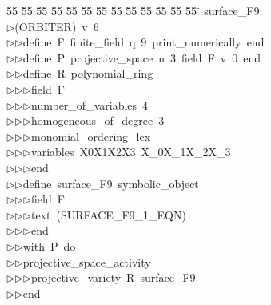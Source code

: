 %
%
\begin{tabbing}
55 \= 55 \= 55 \= 55 \= 55 \= 55 \= 55 \= 55 \= 55 \= 55 \= 55 \= 55 \= 55 \= \kill
surface\_F9:\\[0pt]
$\triangleright$\>(ORBITER)\ v\ 6\ \\[0pt]
$\triangleright$\>$\triangleright$\>define\ F\ finite\_field\ q\ 9\ print\_numerically\ end\ \\[0pt]
$\triangleright$\>$\triangleright$\>define\ P\ projective\_space\ n\ 3\ field\ F\ v\ 0\ end\ \\[0pt]
$\triangleright$\>$\triangleright$\>define\ R\ polynomial\_ring\ \\[0pt]
$\triangleright$\>$\triangleright$\>$\triangleright$\>field\ F\ \\[0pt]
$\triangleright$\>$\triangleright$\>$\triangleright$\>number\_of\_variables\ 4\ \\[0pt]
$\triangleright$\>$\triangleright$\>$\triangleright$\>homogeneous\_of\_degree\ 3\ \\[0pt]
$\triangleright$\>$\triangleright$\>$\triangleright$\>monomial\_ordering\_lex\ \\[0pt]
$\triangleright$\>$\triangleright$\>$\triangleright$\>variables\ X0X1X2X3\ X\_0X\_1X\_2X\_3\ \\[0pt]
$\triangleright$\>$\triangleright$\>$\triangleright$\>end\ \\[0pt]
$\triangleright$\>$\triangleright$\>define\ surface\_F9\ symbolic\_object\ \\[0pt]
$\triangleright$\>$\triangleright$\>$\triangleright$\>field\ F\ \\[0pt]
$\triangleright$\>$\triangleright$\>$\triangleright$\>text\ (SURFACE\_F9\_1\_EQN)\ \\[0pt]
$\triangleright$\>$\triangleright$\>$\triangleright$\>end\ \\[0pt]
$\triangleright$\>$\triangleright$\>with\ P\ do\ \\[0pt]
$\triangleright$\>$\triangleright$\>projective\_space\_activity\ \\[0pt]
$\triangleright$\>$\triangleright$\>$\triangleright$\>projective\_variety\ R\ surface\_F9\ \ \\[0pt]
$\triangleright$\>$\triangleright$\>end\\[0pt]
\end{tabbing}
